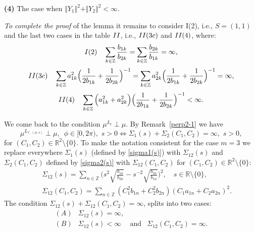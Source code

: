 \documentclass[preprint,12pt]{elsarticle}
\numberwithin{equation}{section}
\begin{document}
{\bf (4)} The case when $\Vert Y_1 \Vert^2+\Vert Y_2 \Vert^2<\infty.$

{\it To complete the proof} of the lemma it remains to consider I(2), i.e., $S=(1,1)$
and the last two  cases in the table ${\rm
II}$, i.e., ${\rm II(3c)}$ and  ${\rm II(4)}$, where:
\begin{equation}
\label{I(3c3)}
{\rm I(2)}\quad
\sum_{k\in{\mathbb Z}}\frac{b_{1k}}{b_{2k}}=\sum_{k\in{\mathbb Z}}\frac{b_{2k}}{b_{1k}}=\infty,
\end{equation}
\begin{equation}
{\rm II(3c)}\quad \sum_{k\in{\mathbb Z}}a_{1k}^2\Big(\frac{1}{2b_{1k}}+\frac{1}{2b_{2k}}\Big)^{-1}=
\sum_{k\in{\mathbb Z}}a_{2k}^2\Big(\frac{1}{2b_{1k}}+\frac{1}{2b_{2k}}\Big)^{-1}=\infty,
\end{equation}
\begin{equation}
\label{I+II(d)}
{\rm II(4)}\quad
\sum_{k\in{\mathbb Z}}\Big(a_{1k}^2+a_{2k}^2\Big)\Big(\frac{1}{2b_{1k}}+\frac{1}{2b_{2k}}\Big)^{-1}<\infty.
\end{equation}

We come back to the condition $\mu^{L_t}\perp\mu$. By Remark~\ref{perp2-1} we have
$$
\mu^{L_{\tau_-(\phi,s)}}\perp\mu,\,\,\,\phi\in[0,2\pi),\,\,s>0\Leftrightarrow
\Sigma_1(s)+\Sigma_2(C_1,C_2)\!=\!\infty,\,\,s>0,
$$
for $(C_1,C_2)\in{\mathbb R}^2\setminus\{0\}$.
To make the notation consistent for the case $m=3$ we replace everywhere $\Sigma_1(s)$ (defined by  \eqref{sigma1(s)}) with $\Sigma_{12}(s)$ and 
$\Sigma_2(C_1,C_2)$  defined by \eqref{sigma2(s)} with
$\Sigma_{12}(C_1,C_2)$ for $
(C_1,C_2)\in {\mathbb R}^2\setminus\{0\}
$:
%
\begin{eqnarray}
\label{sigma12(s)}
&&
\Sigma_{12}(s)
%
=\sum_{n\in {\mathbb Z}}
\Big(s^2\sqrt{\frac{b_{1n}}{b_{2n}}}-s^{-2}\!\sqrt{\frac{b_{2n}}{b_{1n}}}\Big)^2,\quad s\in \mathbb R\setminus\{0\}, \\
\label{Sigma12(s)}
&&
\Sigma_{12}(C_1,C_2)=\sum_{n\in {\mathbb Z}}(C^2_1b_{1n}+C^2_2b_{2n})(C_1a_{1n}+C_2a_{2n})^2.
\end{eqnarray}
The condition $\Sigma_{12}(s)+\Sigma_{12}(C_1,C_2)\!=\!\infty$, splits into two cases:
\begin{equation}
\label{A,B}
\begin{array}{cccc}
(A) & \Sigma_{12}(s)=\infty,&&\\
(B) &\Sigma_{12}(s)<\infty&\text{and}& \Sigma_{12}(C_1,C_2)=\infty.
\end{array}
\end{equation}
\end{document}
